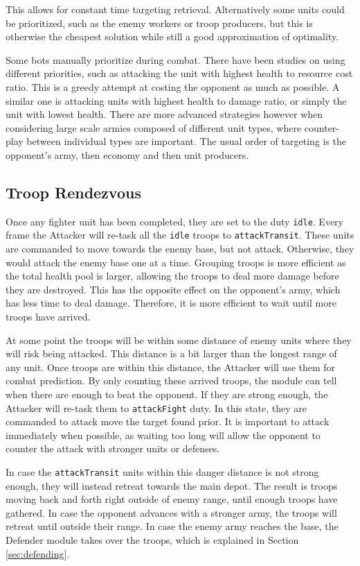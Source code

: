 	This allows for constant time targeting retrieval. Alternatively some units could be prioritized, such as the enemy workers or troop producers, but this is otherwise the cheapest solution while still a good approximation of optimality.
	
	Some bots manually prioritize during combat. There have been studies on using different priorities, such as attacking the unit with highest health to resource cost ratio. This is a greedy attempt at costing the opponent as much as possible. A similar one is attacking units with highest health to damage ratio, or simply the unit with lowest health. There are more advanced strategies however when considering large scale armies composed of different unit types, where counter-play between individual types are important. The usual order of targeting is the opponent's army, then economy and then unit producers.
	
	\subsection*{Troop Rendezvous}
	Once any fighter unit has been completed, they are set to the duty \texttt{idle}. Every frame the Attacker will re-task all the \texttt{idle} troops to \texttt{attackTransit}. These units are commanded to move towards the enemy base, but not attack. Otherwise, they would attack the enemy base one at a time. Grouping troops is more efficient as the total health pool is larger, allowing the troops to deal more damage before they are destroyed. This has the opposite effect on the opponent's army, which has less time to deal damage. Therefore, it is more efficient to wait until more troops have arrived.
		
	At some point the troops will be within some distance of enemy units where they will risk being attacked. This distance is a bit larger than the longest range of any unit. Once troops are within this distance, the Attacker will use them for combat prediction. By only counting these arrived troops, the module can tell when there are enough to beat the opponent. If they are strong enough, the Attacker will re-task them to \texttt{attackFight} duty. In this state, they are commanded to attack move the target found prior. It is important to attack immediately when possible, as waiting too long will allow the opponent to counter the attack with stronger units or defenses.
	
	In case the \texttt{attackTransit} units within this danger distance is not strong enough, they will instead retreat towards the main depot. The result is troops moving back and forth right outside of enemy range, until enough troops have gathered. In case the opponent advances with a stronger army, the troops will retreat until outside their range. In case the enemy army reaches the base, the Defender module takes over the troops, which is explained in Section \ref{sec:defending}.
	
